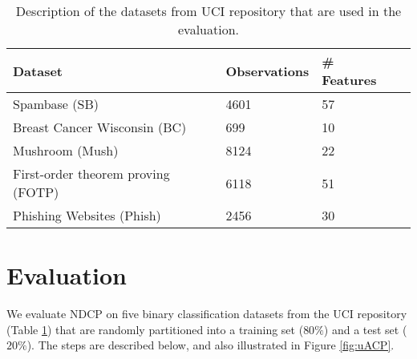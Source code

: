 \documentclass[main]{subfiles}
\begin{document}
\begin{table} [b]
\caption{Description of the datasets from UCI repository that are used in the evaluation.} \centering
\vspace{1em}
\begin{tabular}{llllc}
\toprule
Dataset && Observations & \# Features \\
\midrule
Spambase (SB) & & 4601 & 57 \\
\hline
Breast Cancer Wisconsin (BC)  & & 699 & 10 \\
\hline
Mushroom (Mush)& & 8124 & 22 \\
\hline
 First-order theorem proving (FOTP) & & 6118 & 51 \\
\hline
Phishing Websites (Phish) & & 2456 & 30 \\

\bottomrule
\end{tabular}\label{tab:datasets}
\end{table}



\section{Evaluation}

We evaluate NDCP on five binary classification datasets from the UCI repository (Table \ref{tab:datasets}) that are randomly partitioned into a training set ($80\%$) and a test set ($20\%$). The steps are described below, and also illustrated in Figure \ref{fig:uACP}.

\end{document}
